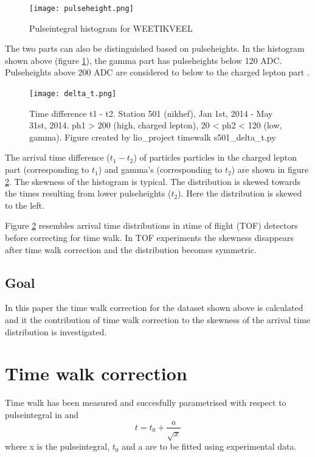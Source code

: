 \documentclass[a4paper,11pt]{article}
\begin{document}
\begin{figure}[h!]
  \centering
    \texttt{[image: pulseheight.png]}
  \caption{Pulseintegral histogram for WEETIKVEEL}
  \label{fig_hist}
\end{figure}

The two parts can also be distinguished based on pulseheights. In the histogram shown above (figure \ref{fig_hist}), the gamma part has pulseheights below 120 ADC. Pulseheights above 200 ADC are considered to below to the charged lepton part \cite{Pennink:2010}.

\begin{figure}[h!]
  \centering
    \texttt{[image: delta\_t.png]}
  \caption{Time difference t1 - t2. Station 501 (nikhef), Jan 1st, 2014 - May 31st, 2014. ph1 > 200 (high, charged lepton), 20 < ph2 < 120 (low, gamma). Figure created by lio\_project timewalk s501\_delta\_t.py}
  \label{fig_delta_t}
\end{figure}

The arrival time difference ($t_1 - t_2$) of particles particles in the charged lepton part (corresponding to $t_1$) and gamma's (corresponding to $t_2$) are shown in figure \ref{fig_delta_t}. The skewness of the histogram is typical. The distribution is skewed towards the times resulting from lower pulseheights ($t_2$). Here the distribution is skewed to the left.

Figure \ref{fig_delta_t} resembles arrival time distributions in \i{time of flight} (TOF) detectors before correcting for time walk. In TOF experiments the skewness disappears after time walk correction and the distribution becomes symmetric.
\subsection{Goal}
In this paper the time walk correction for the dataset shown above is calculated and it the contribution of time walk correction to the skewness of the arrival time distribution is investigated. 

\section{Time walk correction}

Time walk has been measured and succesfully parametrised with respect to pulseintegral in \cite{Brown:1983ka} and \cite{Smith:2002}
\begin{equation}
t = t_0 + \frac{ a }{\sqrt{x}}
\end{equation}
where x is the pulseintegral, $t_0$ and a are to be fitted using experimental data.
\end{document}
